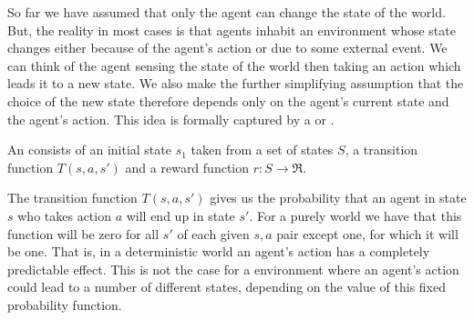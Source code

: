 So far we have assumed that only the agent can change the state of the
world. But, the reality in most cases is that agents inhabit an
environment whose state changes either because of the agent's action
or due to some external event. We can think of the agent sensing the
state of the world then taking an action which leads it to a new
state. We also make the further simplifying assumption that the choice
of the new state therefore depends only on the agent's current state
and the agent's action. This idea is formally captured by a  or .
\begin{definition}
  An  consists of an initial state $s_1$ taken from a set of
  states $S$, a transition function $T(s,a,s')$ and a reward function
  $r: S \rightarrow \Re$.
\end{definition}

The transition function $T(s,a,s')$ gives us the probability that an
agent in state $s$ who takes action $a$ will end up in state $s'$.
For a purely  world we have that this function will
be zero for all $s'$ of each given $s,a$ pair except one, for which it
will be one.  That is, in a deterministic world an agent's action has
a completely predictable effect. This is not the case for a
 environment where an agent's action could lead
to a number of different states, depending on the value of this fixed
probability function.

